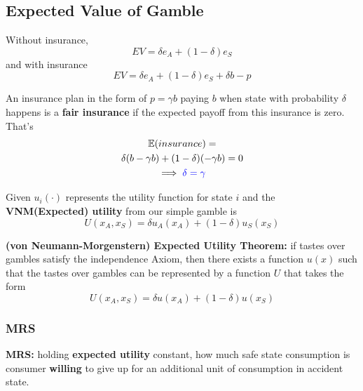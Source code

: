 \documentclass[]{article}
\begin{document}
        \subsection{Expected Value of Gamble}
            \par Without insurance, 
            \[
                EV = \delta e_A + (1 - \delta)e_S
            \]
            and with insurance
            \[
                EV = \delta e_A + (1 - \delta) e_S + \delta b - p
            \]
            \begin{definition}
                An insurance plan in the form of $p = \gamma b$ paying $b$ when state with probability $\delta$ happens is a \textbf{fair insurance} if the expected payoff from this insurance is zero. That's 
                \begin{gather*}
                    \mathbb{E}(insurance) = \\
                    \delta (b - \gamma b) + (1 - \delta) (- \gamma b) = 0\\
                    \implies \textcolor{blue}{\delta = \gamma}
                \end{gather*}
            \end{definition}    
            
            \begin{definition}
                Given $u_i(\cdot)$ represents the utility function for state $i$ and the \textbf{VNM(Expected) utility} from our simple gamble is 
                \[
                    U(x_A, x_S) = \delta u_A(x_A) + (1 - \delta)u_S(x_S)
                \]
            \end{definition}
            
            \begin{theorem}
                \textbf{(von Neumann-Morgenstern) Expected Utility Theorem: } if tastes over gambles satisfy the independence Axiom, then there exists a function $u(x)$ such that the tastes over gambles can be represented by a function $U$ that takes the form
                \[
                    U(x_A, x_S) = \delta u(x_A) + (1 - \delta) u(x_S)
                \]
            \end{theorem}
        
            \subsubsection{MRS}
                \begin{definition}
                    \textbf{MRS: } holding \textbf{expected utility} constant, how much safe state consumption is consumer \textbf{willing} to give up for an additional unit of consumption in accident state.
                \end{definition}
                
\end{document}
